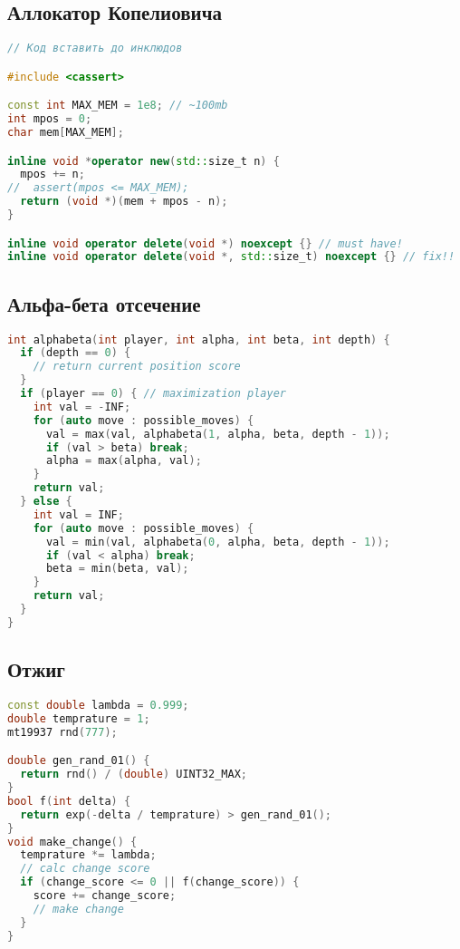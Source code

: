 \documentclass[9pt,a4paper,landscape,twosided]{extarticle}
\begin{document}
\begin{multicols*}{3}
\subsection{Аллокатор Копелиовича}
\begin{lstlisting}[language=C++]
// Код вставить до инклюдов

#include <cassert>

const int MAX_MEM = 1e8; // ~100mb
int mpos = 0;
char mem[MAX_MEM];

inline void *operator new(std::size_t n) {
  mpos += n;
//  assert(mpos <= MAX_MEM);
  return (void *)(mem + mpos - n);
}

inline void operator delete(void *) noexcept {} // must have!
inline void operator delete(void *, std::size_t) noexcept {} // fix!!
\end{lstlisting}

\subsection{Альфа-бета отсечение}
\begin{lstlisting}[language=C++]
int alphabeta(int player, int alpha, int beta, int depth) {
  if (depth == 0) {
    // return current position score
  }
  if (player == 0) { // maximization player
    int val = -INF;
    for (auto move : possible_moves) {
      val = max(val, alphabeta(1, alpha, beta, depth - 1));
      if (val > beta) break;
      alpha = max(alpha, val);
    }
    return val;
  } else {
    int val = INF;
    for (auto move : possible_moves) {
      val = min(val, alphabeta(0, alpha, beta, depth - 1));
      if (val < alpha) break;
      beta = min(beta, val);
    }
    return val;
  }
}
\end{lstlisting}

\subsection{Отжиг}
\begin{lstlisting}[language=C++]
const double lambda = 0.999;
double temprature = 1;
mt19937 rnd(777);

double gen_rand_01() {
  return rnd() / (double) UINT32_MAX;
}
bool f(int delta) {
  return exp(-delta / temprature) > gen_rand_01();
}
void make_change() {
  temprature *= lambda;
  // calc change score
  if (change_score <= 0 || f(change_score)) {
    score += change_score;
    // make change
  }
}
\end{lstlisting}


\end{multicols*}
\end{document}
